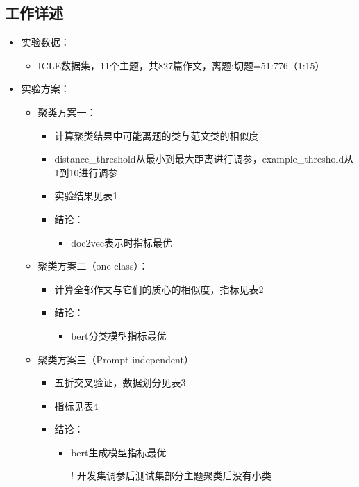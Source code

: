 \documentclass[11pt]{article}
\begin{document}
\begin{CJK}{UTF8}{gkai}
\section{工作详述}
\begin{itemize}
  \item 实验数据：
  \begin{itemize}
    \item ICLE数据集，11个主题，共827篇作文，离题:切题=51:776（1:15）
  \end{itemize}
  \item 实验方案：
  \begin{itemize}
    \item 聚类方案一：
    \begin{itemize}
      \item 计算聚类结果中可能离题的类与范文类的相似度
      \item distance\_threshold从最小到最大距离进行调参，example\_threshold从1到10进行调参
      \item 实验结果见表1
      \item 结论：
      \begin{itemize}
        \item doc2vec表示时指标最优
      \end{itemize}
    \end{itemize}
    \item 聚类方案二（one-class）：
    \begin{itemize}
      \item 计算全部作文与它们的质心的相似度，指标见表2
      \item 结论：
      \begin{itemize}
        \item bert分类模型指标最优
      \end{itemize}
    \end{itemize}
    \item 聚类方案三（Prompt-independent）
    \begin{itemize}
      \item 五折交叉验证，数据划分见表3
      \item 指标见表4
      \item 结论：
      \begin{itemize}
        \item bert生成模型指标最优
        \item [!] 开发集调参后测试集部分主题聚类后没有小类
      \end{itemize}
    \end{itemize}
    

\end{itemize}
\end{itemize}
\end{CJK}
\end{document}

